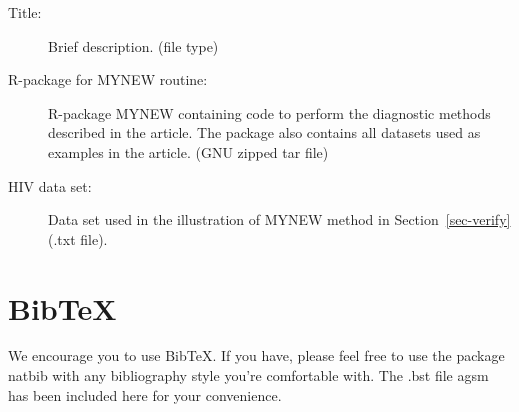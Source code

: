 \documentclass[
  12pt]{article}
\begin{document}
\begin{description}
\item[Title:]
Brief description. (file type)
\item[R-package for MYNEW routine:]
R-package MYNEW containing code to perform the diagnostic methods
described in the article. The package also contains all datasets used as
examples in the article. (GNU zipped tar file)
\item[HIV data set:]
Data set used in the illustration of MYNEW method in
Section~\ref{sec-verify} (.txt file).
\end{description}

\section{BibTeX}\label{bibtex}

We encourage you to use BibTeX. If you have, please feel free to use the
package natbib with any bibliography style you're comfortable with. The
.bst file agsm has been included here for your convenience.



\end{document}
